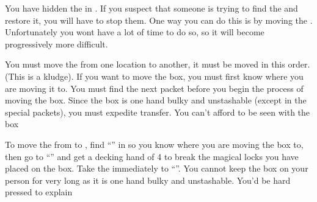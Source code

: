 \documentclass[green]{NeptuneBall}
\begin{document}
\name{\gMoveMusicBox{}}

You have hidden the \iMusicBox{} in \sPacketA{\myLoc}. If you suspect that someone is trying to find the \iMusicBox{} and restore it, you will have to stop them. One way you can do this is by moving the \iMusicBox{}. Unfortunately you wont have a lot of time to do so, so it will become progressively more difficult. 

You must move the \iMusicBox{} from one location to another, it must be moved in this order. (This is a kludge). If you want to move the box, you must first know where you are moving it to. You must find the next packet before you begin the process of moving the box. Since the box is one hand bulky and unstashable (except in the special packets), you must expedite transfer. You can't afford to be seen with the box

To move the \iMusicBox{} from \sPacketA{\myLoc} to \sPacketB{\myLoc}, find ``\sPacketB{}'' in \sPacketB{\myLoc} so you know where you are moving the box to, then go to ``\sPacketA{}'' and get a decking hand of 4 to break the magical locks you have placed on the box. Take the \iMusicBox{} immediately to ``\sPacketB{}''. You cannot keep the box on your person for very long as it is one hand bulky and unstashable. You'd be hard pressed to explain
\end{document}

